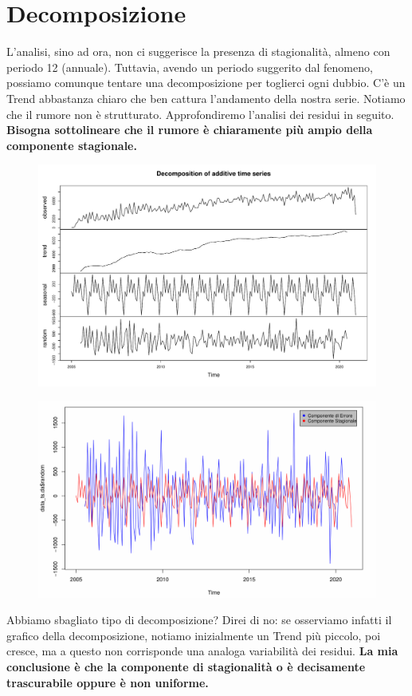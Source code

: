 \documentclass[11pt,a4paper]{article}
\begin{document}
\section{Decomposizione}
L'analisi, sino ad ora, non ci suggerisce la presenza di stagionalit\`a, almeno
con periodo 12 (annuale). Tuttavia, avendo un periodo suggerito dal fenomeno,
possiamo comunque tentare una decomposizione per toglierci ogni dubbio.
C'\`e un Trend abbastanza chiaro che ben cattura l'andamento della nostra serie.
Notiamo che il rumore non \`e strutturato. Approfondiremo l'analisi dei residui
in seguito. \textbf{Bisogna sottolineare che il rumore \`e chiaramente pi\`u
ampio della componente stagionale.}
\clearpage
\begin{figure}[H]
	\vspace{-1.5cm}
	\hspace{-1.5cm}
	\includegraphics[scale=0.7]{imgs/decompose_additive.pdf}
	\vspace{-0.9cm}
\end{figure}
\begin{figure}[H]
	\vspace{-0.9cm}
	\hspace{-1.5cm}
	\includegraphics[scale=0.7]{imgs/random_seasonal.pdf}
	\vspace{-0.9cm}
\end{figure}
\noindent
Abbiamo sbagliato tipo di decomposizione? Direi di no: se osserviamo infatti il
grafico della decomposizione, notiamo  inizialmente un Trend pi\`u piccolo, poi
cresce, ma a questo non corrisponde una analoga variabilit\`a dei residui.
\textbf{La mia conclusione \`e che la componente di stagionalit\`a o \`e
decisamente trascurabile oppure \`e non uniforme.}
\end{document}
